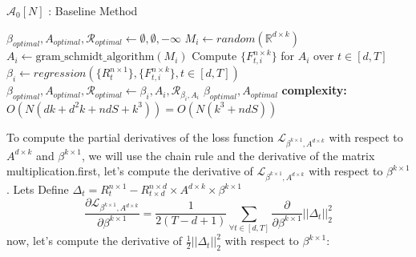 \begin{algorithm}[H]
\caption{$\mathcal{A}_{0}[N]$ : Baseline Method}\label{lfm_baseline_method}
\begin{algorithmic}[1]
\State $\beta_{optimal}, A_{optimal}, \mathcal{R}_{optimal} \gets \emptyset, \emptyset, -\infty $
    \State $M_i \gets random(\mathbb{R}^{d\times k})$
    \State $A_i \gets \text{gram\_schmidt\_algorithm}(M_i)$
    \State Compute $\{F^{n\times k}_{t, i}\}$ for $A_i$ over $t\in [d,T]$
    \State $\beta_i \gets regression(\{R^{n\times 1}_{t}\},\{F^{n\times k}_{t, i}\}, t\in [d,T])$
      
        \State $\beta_{optimal}, A_{optimal}, \mathcal{R}_{optimal} \gets \beta_{i}, A_{i}, \mathcal{R}_{\beta_i, A_i} $
    \EndIf 
\EndFor
\State \Return  $\beta_{optimal}, A_{optimal}$
\State \textbf{complexity: } $O(N(dk+d^2k+ndS+k^3)) = 
 O(N(k^3+ndS))$
\end{algorithmic}
\end{algorithm}
To compute the partial derivatives of the loss function $\mathcal{L}_{\beta^{k \times 1}, A^{d\times k}}$ with respect to $A^{d\times k}$ and $\beta^{k \times 1}$, we will use the chain rule and the derivative of the matrix multiplication.\newline \newline first, let's compute the derivative of $\mathcal{L}_{\beta^{k \times 1}, A^{d\times k}}$ with respect to $\beta^{k \times 1}$. Lets Define $\Delta_t = R^{n\times 1}_t-R^{n\times d}_{t\times d}\times A^{d\times k} \times \beta^{k \times 1}$
\begin{equation}
    \frac{\partial \mathcal{L}_{\beta^{k \times 1}, A^{d\times k}}}{\partial \beta^{k \times 1}} = \frac{1}{2(T-d+1)} \sum_{\forall t\in [d,T]} \frac{\partial}{\partial \beta^{k \times 1}} ||\Delta_t||_2^2 
\end{equation}
\newline now, let's compute the derivative of $\frac{1}{2}||\Delta_t||_2^2$ with respect to $\beta^{k\times 1}$:

